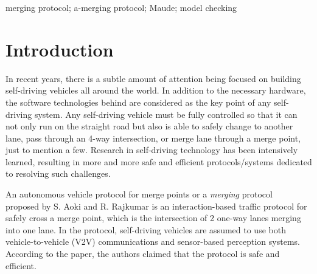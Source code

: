 \documentclass[10pt, conference, compsocconf]{IEEEtran}
\begin{document}
\begin{IEEEkeywords}
merging protocol; a-merging protocol; Maude; model checking

\end{IEEEkeywords}

%
\IEEEpeerreviewmaketitle


\setlength{\parindent}{1em}
\section{Introduction}
 \label{sect_intro}
In recent years, there is a subtle amount of attention being focused on building self-driving vehicles all around the world.
In addition to the necessary hardware, the software technologies behind are considered as the key point of any self-driving system.
Any self-driving vehicle must be fully controlled so that it can not only run on the straight road but also is able to safely change to another lane, pass through an 4-way intersection, or merge lane through a merge point, just to mention a few.
Research in self-driving technology has been intensively learned, resulting in more and more safe and efficient protocols/systems dedicated to resolving such challenges.

An autonomous vehicle protocol for merge points or a \textit{merging} protocol~\cite{10.1145/3055004.3055028} proposed by S. Aoki and R. Rajkumar is an interaction-based traffic protocol for safely cross a merge point, which is the intersection of 2 one-way lanes merging into one lane. 
In the protocol, self-driving vehicles are assumed to use both vehicle-to-vehicle (V2V) communications and
sensor-based perception systems.
According to the paper, the authors claimed that the protocol is safe and efficient.
\end{document}
